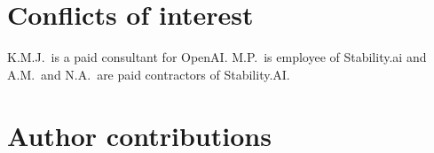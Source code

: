 \documentclass[11pt, oneside]{article}
\begin{document}
\section*{Conflicts of interest}
K.M.J.\ is a paid consultant for OpenAI. M.P.\ is employee of Stability.ai and A.M.\ and N.A.\ are paid contractors of Stability.AI.

\section*{Author contributions}

\footnotesize
\insertcredits
\normalsize



\appendix

\end{document}

